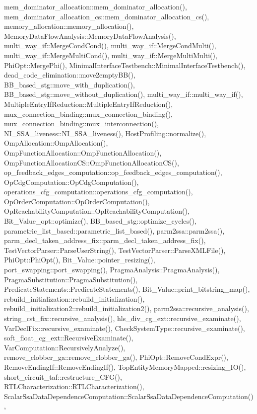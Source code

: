 mem\+\_\+dominator\+\_\+allocation\+::mem\+\_\+dominator\+\_\+allocation(), mem\+\_\+dominator\+\_\+allocation\+\_\+cs\+::mem\+\_\+dominator\+\_\+allocation\+\_\+cs(), memory\+\_\+allocation\+::memory\+\_\+allocation(), Memory\+Data\+Flow\+Analysis\+::\+Memory\+Data\+Flow\+Analysis(), multi\+\_\+way\+\_\+if\+::\+Merge\+Cond\+Cond(), multi\+\_\+way\+\_\+if\+::\+Merge\+Cond\+Multi(), multi\+\_\+way\+\_\+if\+::\+Merge\+Multi\+Cond(), multi\+\_\+way\+\_\+if\+::\+Merge\+Multi\+Multi(), Phi\+Opt\+::\+Merge\+Phi(), Minimal\+Interface\+Testbench\+::\+Minimal\+Interface\+Testbench(), dead\+\_\+code\+\_\+elimination\+::move2empty\+B\+B(), B\+B\+\_\+based\+\_\+stg\+::move\+\_\+with\+\_\+duplication(), B\+B\+\_\+based\+\_\+stg\+::move\+\_\+without\+\_\+duplication(), multi\+\_\+way\+\_\+if\+::multi\+\_\+way\+\_\+if(), Multiple\+Entry\+If\+Reduction\+::\+Multiple\+Entry\+If\+Reduction(), mux\+\_\+connection\+\_\+binding\+::mux\+\_\+connection\+\_\+binding(), mux\+\_\+connection\+\_\+binding\+::mux\+\_\+interconnection(), N\+I\+\_\+\+S\+S\+A\+\_\+liveness\+::\+N\+I\+\_\+\+S\+S\+A\+\_\+liveness(), Host\+Profiling\+::normalize(), Omp\+Allocation\+::\+Omp\+Allocation(), Omp\+Function\+Allocation\+::\+Omp\+Function\+Allocation(), Omp\+Function\+Allocation\+C\+S\+::\+Omp\+Function\+Allocation\+C\+S(), op\+\_\+feedback\+\_\+edges\+\_\+computation\+::op\+\_\+feedback\+\_\+edges\+\_\+computation(), Op\+Cdg\+Computation\+::\+Op\+Cdg\+Computation(), operations\+\_\+cfg\+\_\+computation\+::operations\+\_\+cfg\+\_\+computation(), Op\+Order\+Computation\+::\+Op\+Order\+Computation(), Op\+Reachability\+Computation\+::\+Op\+Reachability\+Computation(), Bit\+\_\+\+Value\+\_\+opt\+::optimize(), B\+B\+\_\+based\+\_\+stg\+::optimize\+\_\+cycles(), parametric\+\_\+list\+\_\+based\+::parametric\+\_\+list\+\_\+based(), parm2ssa\+::parm2ssa(), parm\+\_\+decl\+\_\+taken\+\_\+address\+\_\+fix\+::parm\+\_\+decl\+\_\+taken\+\_\+address\+\_\+fix(), Test\+Vector\+Parser\+::\+Parse\+User\+String(), Test\+Vector\+Parser\+::\+Parse\+X\+M\+L\+File(), Phi\+Opt\+::\+Phi\+Opt(), Bit\+\_\+\+Value\+::pointer\+\_\+resizing(), port\+\_\+swapping\+::port\+\_\+swapping(), Pragma\+Analysis\+::\+Pragma\+Analysis(), Pragma\+Substitution\+::\+Pragma\+Substitution(), Predicate\+Statements\+::\+Predicate\+Statements(), Bit\+\_\+\+Value\+::print\+\_\+bitstring\+\_\+map(), rebuild\+\_\+initialization\+::rebuild\+\_\+initialization(), rebuild\+\_\+initialization2\+::rebuild\+\_\+initialization2(), parm2ssa\+::recursive\+\_\+analysis(), string\+\_\+cst\+\_\+fix\+::recursive\+\_\+analysis(), hls\+\_\+div\+\_\+cg\+\_\+ext\+::recursive\+\_\+examinate(), Var\+Decl\+Fix\+::recursive\+\_\+examinate(), Check\+System\+Type\+::recursive\+\_\+examinate(), soft\+\_\+float\+\_\+cg\+\_\+ext\+::\+Recursive\+Examinate(), Var\+Computation\+::\+Recursively\+Analyze(), remove\+\_\+clobber\+\_\+ga\+::remove\+\_\+clobber\+\_\+ga(), Phi\+Opt\+::\+Remove\+Cond\+Expr(), Remove\+Ending\+If\+::\+Remove\+Ending\+If(), Top\+Entity\+Memory\+Mapped\+::resizing\+\_\+\+I\+O(), short\+\_\+circuit\+\_\+taf\+::restructure\+\_\+\+C\+F\+G(), R\+T\+L\+Characterization\+::\+R\+T\+L\+Characterization(), Scalar\+Ssa\+Data\+Dependence\+Computation\+::\+Scalar\+Ssa\+Data\+Dependence\+Computation(), 